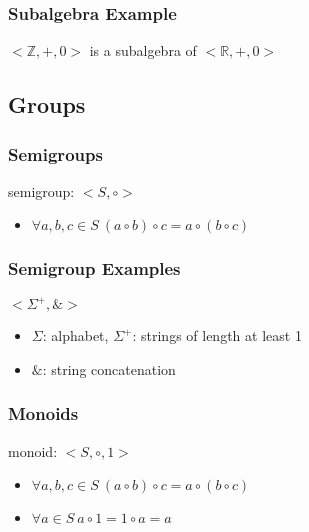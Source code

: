 \documentclass[dvipsnames]{beamer}
\begin{document}
\begin{frame}
  \frametitle{Subalgebra Example}

  \begin{example}
    $<\mathbb{Z},+,0>$
    is a subalgebra of $<\mathbb{R},+,0>$
  \end{example}
\end{frame}

\subsection{Groups}

\begin{frame}
  \frametitle{Semigroups}

  \begin{definition}
    \alert{semigroup}: $<S,\circ>$
    \begin{itemize}
      \item $\forall a,b,c \in S~(a \circ b) \circ c = a \circ (b \circ c)$
    \end{itemize}
  \end{definition}
\end{frame}

\begin{frame}
  \frametitle{Semigroup Examples}

  \begin{example}
    $<\Sigma^+,\&>$

    \begin{itemize}
      \item $\Sigma$: alphabet, $\Sigma^+$: strings of length at least 1
      \item $\&$: string concatenation
    \end{itemize}
  \end{example}
\end{frame}

\begin{frame}
  \frametitle{Monoids}

  \begin{definition}
    \alert{monoid}: $<S,\circ,1>$

    \begin{itemize}
      \item $\forall a,b,c \in S~(a \circ b) \circ c = a \circ (b \circ c)$
      \item $\forall a \in S~a \circ 1 = 1 \circ a = a$
    \end{itemize}
  \end{definition}
\end{frame}
\end{document}
